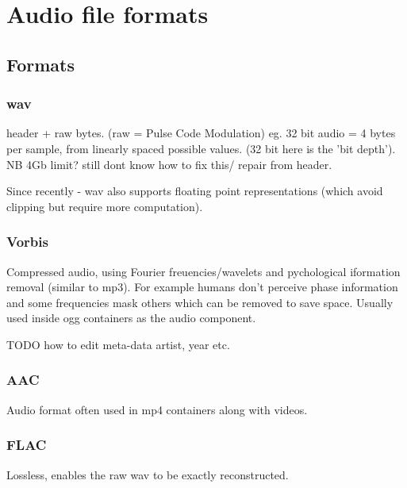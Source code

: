\documentclass[oneside,english]{scrbook}
\begin{document}
\chapter{Audio file formats}

\section{Formats}
\subsection{wav}

header + raw bytes. (raw = Pulse Code Modulation) eg. 32 bit audio = 4 bytes per sample, from linearly spaced possible values. (32 bit here is the 'bit depth').
NB 4Gb limit? still dont know how to fix this/ repair from header.

Since recently - wav also supports floating point representations (which avoid clipping but require more computation).

\subsection{Vorbis}
Compressed audio, using Fourier freuencies/wavelets and pychological iformation removal (similar to mp3).  For example humans don't perceive phase information and some frequencies mask others which can be removed to save space.  Usually used inside ogg containers as the audio component.

TODO how to edit meta-data artist, year etc.

\subsection{AAC}
Audio format often used in mp4 containers along with videos.

\subsection{FLAC}
Lossless, enables the raw wav to be exactly reconstructed.
\end{document}
